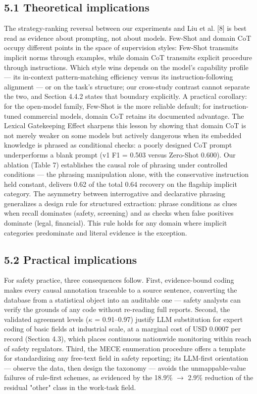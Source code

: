 \documentclass[11pt]{article}
\begin{document}
\subsection{5.1 Theoretical implications}
The strategy-ranking reversal between our experiments and Liu et al. [8] is best read as evidence about prompting, not about models. Few-Shot and domain CoT occupy different points in the space of supervision styles: Few-Shot transmits implicit norms through examples, while domain CoT transmits explicit procedure through instructions. Which style wins depends on the model's capability profile --- its in-context pattern-matching efficiency versus its instruction-following alignment --- or on the task's structure; our cross-study contrast cannot separate the two, and Section 4.4.2 states that boundary explicitly. A practical corollary: for the open-model family, Few-Shot is the more reliable default; for instruction-tuned commercial models, domain CoT retains its documented advantage. The Lexical Gatekeeping Effect sharpens this lesson by showing that domain CoT is not merely weaker on some models but actively dangerous when its embedded knowledge is phrased as conditional checks: a poorly designed CoT prompt underperforms a blank prompt (v1 F1 = 0.503 versus Zero-Shot 0.600). Our ablation (Table 7) establishes the causal role of phrasing under controlled conditions --- the phrasing manipulation alone, with the conservative instruction held constant, delivers 0.62 of the total 0.64 recovery on the flagship implicit category. The asymmetry between interrogative and declarative phrasing generalizes a design rule for structured extraction: phrase conditions as clues when recall dominates (safety, screening) and as checks when false positives dominate (legal, financial). This rule holds for any domain where implicit categories predominate and literal evidence is the exception.

\subsection{5.2 Practical implications}
For safety practice, three consequences follow. First, evidence-bound coding makes every causal annotation traceable to a source sentence, converting the database from a statistical object into an auditable one --- safety analysts can verify the grounds of any code without re-reading full reports. Second, the validated agreement levels ($\kappa$ = 0.91--0.97) justify LLM substitution for expert coding of basic fields at industrial scale, at a marginal cost of USD 0.0007 per record (Section 4.3), which places continuous nationwide monitoring within reach of safety regulators. Third, the MECE enumeration procedure offers a template for standardizing any free-text field in safety reporting; its LLM-first orientation --- observe the data, then design the taxonomy --- avoids the unmappable-value failures of rule-first schemes, as evidenced by the 18.9\% $\rightarrow$ 2.9\% reduction of the residual "other" class in the work-task field.
\end{document}
